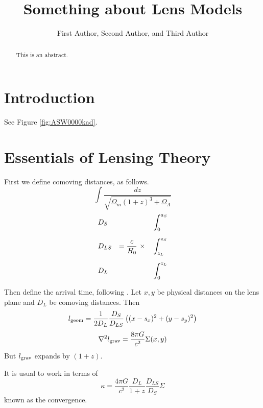 \documentclass[12pt,preprint]{aastex}
\begin{document}
\title{Something about Lens Models}

\author{First Author,
Second Author, and
Third Author}

\begin{abstract}
This is an abstract.
\end{abstract}

\keywords{}

\section{Introduction}

See Figure \ref{fig:ASW0000kad}.

\appendix

\section{Essentials of Lensing Theory}



First we define comoving distances, as follows.
\begin{equation}
\int \frac{dz}{\sqrt{\Omega_m(1+z)^3 + \Omega_\Lambda}}
\end{equation}
\begin{equation}
\begin{aligned}
&D_S    &                                &\int_0^{a_S} \\
\noalign{\medskip}
&D_{LS} & = \frac c{H_0} \ \times \quad  &\int_{z_L}^{z_S} \\
\noalign{\medskip}
&D_L    &                                &\int_0^{z_L}
\end{aligned}
\end{equation}

Then define the arrival time, following \cite{1986ApJ...310..568B}.
Let $x,y$ be physical distances on the lens plane and $D_L$ be
comoving distances.  Then
\begin{equation}
l_{\rm geom} = \frac1{2D_L} \frac{D_S}{D_{LS}}
\left( (x-s_x)^2 + (y-s_y)^2 \right)
\end{equation}
\begin{equation}
\nabla^2 l_{\rm grav} = \frac{8\pi G}{c^2} \Sigma(x,y)
\end{equation}
But $l_{\rm grav}$ expands by $(1+z)$.

It is usual to work in terms of
\begin{equation}
\kappa = \frac{4\pi G}{c^2} \frac{D_L}{1+z} \frac{D_{LS}}{D_S} \Sigma
\end{equation}
known as the convergence.
\end{document}
